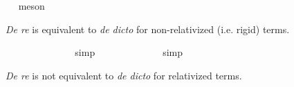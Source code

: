 \begin{isabellebody}
\ %
%
\isamarkupfalse%
\ meson%
%
%
%
\begin{isamarkuptext}%
\emph{De re} is equivalent to \emph{de dicto} for non-relativized (i.e. rigid) terms.%
\end{isamarkuptext}\isamarkuptrue%
\isamarkupfalse%
\ {\isachardoublequoteopen}{\isasymlfloor}\isactrlbold {\isasymforall}{\isasymalpha}{\isachardot}\ {\isacharparenleft}{\isacharparenleft}{\isasymlambda}{\isasymbeta}{\isachardot}\ \isactrlbold {\isasymbox}{\isacharparenleft}{\isasymalpha}\ {\isasymbeta}{\isacharparenright}{\isacharparenright}\ {\isacharparenleft}{\isasymtau}{\isacharcolon}{\isacharcolon}{\isasymlangle}{\isasymzero}{\isasymrangle}{\isacharparenright}{\isacharparenright}\ \ \isactrlbold {\isasymleftrightarrow}\ \isactrlbold {\isasymbox}{\isacharparenleft}{\isacharparenleft}{\isasymlambda}{\isasymbeta}{\isachardot}\ {\isacharparenleft}{\isasymalpha}\ {\isasymbeta}{\isacharparenright}{\isacharparenright}\ {\isasymtau}{\isacharparenright}{\isasymrfloor}{\isachardoublequoteclose}%
\ %
%
\isamarkupfalse%
\ simp%
%
%
\isanewline
{}\isamarkupfalse%
\ {\isachardoublequoteopen}{\isasymlfloor}\isactrlbold {\isasymforall}{\isasymalpha}{\isachardot}\ {\isacharparenleft}{\isacharparenleft}{\isasymlambda}{\isasymbeta}{\isachardot}\ \isactrlbold {\isasymbox}{\isacharparenleft}{\isasymalpha}\ {\isasymbeta}{\isacharparenright}{\isacharparenright}\ {\isacharparenleft}{\isasymtau}{\isacharcolon}{\isacharcolon}{\isasymup}{\isasymlangle}{\isasymzero}{\isasymrangle}{\isacharparenright}{\isacharparenright}\ \isactrlbold {\isasymleftrightarrow}\ \isactrlbold {\isasymbox}{\isacharparenleft}{\isacharparenleft}{\isasymlambda}{\isasymbeta}{\isachardot}\ {\isacharparenleft}{\isasymalpha}\ {\isasymbeta}{\isacharparenright}{\isacharparenright}\ {\isasymtau}{\isacharparenright}{\isasymrfloor}{\isachardoublequoteclose}%
\ %
%
\isamarkupfalse%
\ simp%
%
%
%
\begin{isamarkuptext}%
\emph{De re} is not equivalent to \emph{de dicto} for relativized terms.%
\end{isamarkuptext}\isamarkuptrue%
\isamarkupfalse%
\ {\isachardoublequoteopen}{\isasymlfloor}\isactrlbold {\isasymforall}{\isasymalpha}{\isachardot}\ {\isacharparenleft}{\isacharparenleft}{\isasymlambda}{\isasymbeta}{\isachardot}\ \isactrlbold {\isasymbox}{\isacharparenleft}{\isasymalpha}\ {\isasymbeta}{\isacharparenright}{\isacharparenright}\ \isactrlbold {\isasymdown}{\isacharparenleft}{\isasymtau}{\isacharcolon}{\isacharcolon}{\isasymup}{\isasymlangle}{\isasymzero}{\isasymrangle}{\isacharparenright}{\isacharparenright}\ \isactrlbold {\isasymleftrightarrow}\ \isactrlbold {\isasymbox}{\isacharparenleft}{\isacharparenleft}{\isasymlambda}{\isasymbeta}{\isachardot}\ {\isacharparenleft}{\isasymalpha}\ {\isasymbeta}{\isacharparenright}{\isacharparenright}\ \isactrlbold {\isasymdown}{\isasymtau}{\isacharparenright}{\isasymrfloor}{\isachardoublequoteclose}\ \isanewline

\end{isabellebody}
